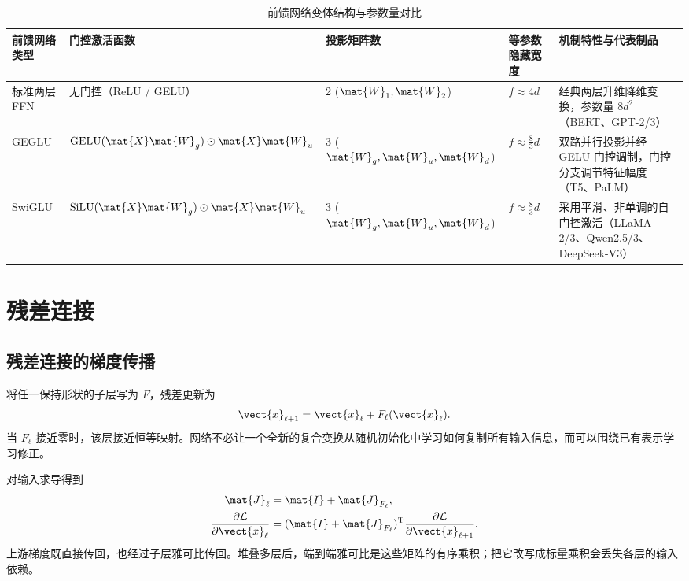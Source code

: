 \documentclass[../textbook.tex]{subfiles}
\begin{document}
\begin{table}[htbp]
\centering
\caption{前馈网络变体结构与参数量对比}\label{tab:mlp-variants}
\begin{tabularx}{\linewidth}{p{20mm}p{28mm}p{18mm}p{22mm}X}
\toprule
前馈网络类型 & 门控激活函数 & 投影矩阵数 & 等参数隐藏宽度 & 机制特性与代表制品 \\\midrule
标准两层 FFN & 无门控（ReLU / GELU） & 2 ($\mat{W}_1, \mat{W}_2$) & $f \approx 4d$ & 经典两层升维降维变换，参数量 $8d^2$（BERT、GPT-2/3） \\
GEGLU & $\operatorname{GELU}(\mat{X}\mat{W}_g) \odot \mat{X}\mat{W}_u$ & 3 ($\mat{W}_g, \mat{W}_u, \mat{W}_d$) & $f \approx \frac{8}{3}d$ & 双路并行投影并经 GELU 门控调制，门控分支调节特征幅度（T5、PaLM） \\
SwiGLU & $\operatorname{SiLU}(\mat{X}\mat{W}_g) \odot \mat{X}\mat{W}_u$ & 3 ($\mat{W}_g, \mat{W}_u, \mat{W}_d$) & $f \approx \frac{8}{3}d$ & 采用平滑、非单调的自门控激活（LLaMA-2/3、Qwen2.5/3、DeepSeek-V3） \\
\bottomrule
\end{tabularx}
\end{table}

\section{残差连接}

\subsection{残差连接的梯度传播}
将任一保持形状的子层写为 $F$，残差更新为
\begin{equation}
 \vect{x}_{\ell+1}=\vect{x}_\ell+F_\ell(\vect{x}_\ell).
\end{equation}
当 $F_\ell$ 接近零时，该层接近恒等映射。网络不必让一个全新的复合变换从随机初始化中学习如何复制所有输入信息，而可以围绕已有表示学习修正。

对输入求导得到
\begin{equation}
 \begin{aligned}
  \mat{J}_\ell&=\mat{I}+\mat{J}_{F_\ell},\\
  \frac{\partial\mathcal L}{\partial \vect{x}_\ell}
  &=(\mat{I}+\mat{J}_{F_\ell})^{\mathrm{T}}
  \frac{\partial\mathcal L}{\partial \vect{x}_{\ell+1}}.
 \end{aligned}
\end{equation}
上游梯度既直接传回，也经过子层雅可比传回。堆叠多层后，端到端雅可比是这些矩阵的有序乘积；把它改写成标量乘积会丢失各层的输入依赖。
\end{document}
